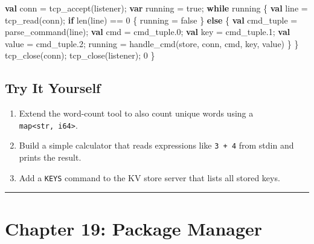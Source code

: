 \documentclass[
  english,
]{book}
\newenvironment{Shaded}{\begin{snugshade}}{\end{snugshade}}
\newcommand{\ConstantTok}[1]{\textcolor[rgb]{0.31,0.76,1.00}{#1}}
\newcommand{\ControlFlowTok}[1]{\textcolor[rgb]{0.77,0.53,0.75}{\textbf{#1}}}
\newcommand{\DecValTok}[1]{\textcolor[rgb]{0.71,0.81,0.66}{#1}}
\newcommand{\FunctionTok}[1]{\textcolor[rgb]{0.86,0.86,0.67}{#1}}
\newcommand{\KeywordTok}[1]{\textcolor[rgb]{0.34,0.61,0.84}{\textbf{#1}}}
\newcommand{\NormalTok}[1]{\textcolor[rgb]{0.83,0.83,0.83}{#1}}
\newcommand{\OperatorTok}[1]{\textcolor[rgb]{0.83,0.83,0.83}{#1}}
\providecommand{\tightlist}{%
  \setlength{\itemsep}{0pt}\setlength{\parskip}{0pt}}
\begin{document}
\begin{Shaded}
\begin{Highlighting}[]
    \KeywordTok{val}\NormalTok{ conn }\OperatorTok{=} \FunctionTok{tcp\_accept}\NormalTok{(listener);}
    \KeywordTok{var}\NormalTok{ running }\OperatorTok{=} \ConstantTok{true}\NormalTok{;}
    \ControlFlowTok{while}\NormalTok{ running \{}
        \KeywordTok{val}\NormalTok{ line }\OperatorTok{=} \FunctionTok{tcp\_read}\NormalTok{(conn);}
        \ControlFlowTok{if} \FunctionTok{len}\NormalTok{(line) }\OperatorTok{==} \DecValTok{0}\NormalTok{ \{}
\NormalTok{            running }\OperatorTok{=} \ConstantTok{false}
\NormalTok{        \} }\ControlFlowTok{else}\NormalTok{ \{}
            \KeywordTok{val}\NormalTok{ cmd\_tuple }\OperatorTok{=}\NormalTok{ parse\_command(line);}
            \KeywordTok{val}\NormalTok{ cmd }\OperatorTok{=}\NormalTok{ cmd\_tuple}\OperatorTok{.}\DecValTok{0}\NormalTok{;}
            \KeywordTok{val}\NormalTok{ key }\OperatorTok{=}\NormalTok{ cmd\_tuple}\OperatorTok{.}\DecValTok{1}\NormalTok{;}
            \KeywordTok{val}\NormalTok{ value }\OperatorTok{=}\NormalTok{ cmd\_tuple}\OperatorTok{.}\DecValTok{2}\NormalTok{;}
\NormalTok{            running }\OperatorTok{=}\NormalTok{ handle\_cmd(store, conn, cmd, key, value)}
\NormalTok{        \}}
\NormalTok{    \}}
    \FunctionTok{tcp\_close}\NormalTok{(conn);}
    \FunctionTok{tcp\_close}\NormalTok{(listener);}
    \DecValTok{0}
\NormalTok{\}}
\end{Highlighting}
\end{Shaded}

\subsection{Try It Yourself}\label{try-it-yourself-17}

\begin{enumerate}
\def\labelenumi{\arabic{enumi}.}
\tightlist
\item
  Extend the word-count tool to also count unique words using a
  \texttt{map\textless{}str,\ i64\textgreater{}}.
\item
  Build a simple calculator that reads expressions like \texttt{3\ +\ 4}
  from stdin and prints the result.
\item
  Add a \texttt{KEYS} command to the KV store server that lists all
  stored keys.
\end{enumerate}

\begin{center}\rule{0.5\linewidth}{0.5pt}\end{center}

\section{Chapter 19: Package Manager}\label{chapter-19-package-manager}
\end{document}
